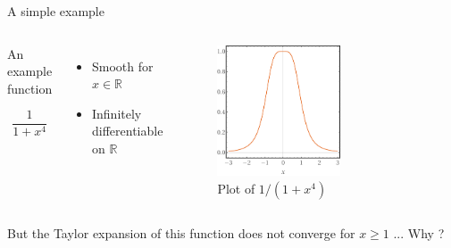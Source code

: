 \documentclass[xcolor=x11names,compress]{beamer}
\renewcommand{\(}{\begin{columns}}
\renewcommand{\)}{\end{columns}}
\newcommand{\<}[1]{\begin{column}{#1}}
\renewcommand{\>}{\end{column}}
\begin{document}
\begin{frame}{A simple example}

\begin{columns}


\begin{beamerboxesrounded}[scheme=foncé]{An example function}

\begin{equation*}
   \frac{1}{1 + x^4}
\end{equation*}

\end{beamerboxesrounded}

\vspace{1cm}

\begin{itemize}
    \item Smooth for $x \in \mathbb{R}$
    
    \item Infinitely differentiable on $\mathbb{R}$
\end{itemize}


    \begin{figure}
    \centering
    \includegraphics[width=0.6\textwidth]{exemplesingu.pdf}
    \caption{Plot of $1/(1+x^4)$}
    \label{fig:my_label}
\end{figure}

\end{columns}

But the Taylor expansion of this function does not converge for $x\geq1$ ... 
\vspace{0.3cm}
\centering Why ?

\end{frame}
\end{document}
